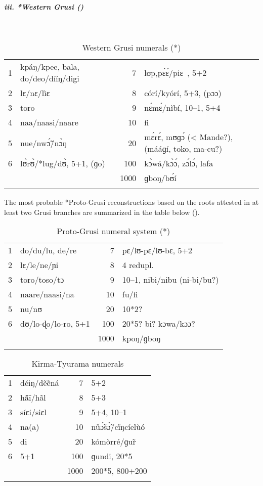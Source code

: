 \subparagraph{iii. *Western Grusi ()}
~
\begin{table}[h]
\caption{\label{tab:3:176}Western Grusi numerals (*)}
\begin{tabularx}{\textwidth}{llrQ}
\lsptoprule
{1} & kpáŋ/kpee, bala, do/deo/dííŋ/digi & {7} & lʊp,p{\'{ɛ}}{\'{ɛ}}/piɛ~, 5+2\\
{2} & lɛ/nɛ/lìɛ & {8} & córí/kyórí, 5+3, (pɔɔ)\\
{3} & toro & {9} & n{\'{ɛ}}m{\'{ɛ}}/nìbí, 10--1, 5+4\\
{4} & naa/naasi/naare & {10} & fi\\
{5} & nue/nw{\'{\~ɔ}}/n{\`{ɔ}}ŋ & {20} & m{\'{ɛ}}r{\'{ɛ}}, mʊɡ{\'{ɔ}} (< Mande?), (mááɡí, toko, ma-cu?)\\
{6} & l{\`{ʊ}}r{\`{ʊ}}/*lug/d{\`{ʊ}}, 5+1, (ɡo) & {100} & k{\`{ɔ}}wá/k{\`{ɔ}}{\'{ɔ}}, z{\'{ɔ}}l{\'{ɔ}}, lafa\\
&  & {1000} & ɡboŋ/b{\'{ʊ}}í\\
\lspbottomrule
\end{tabularx}
\end{table}

  
The most probable *Proto-Grusi reconstructions based on the roots attested in at least two Grusi branches are summarized in the table below ().

\begin{table}
\caption{\label{tab:3:177}Proto-Grusi numeral system (*)}
\begin{tabularx}{\textwidth}{lXrl}
\lsptoprule
{1} & do/du/lu, de/re & {7} & pɛ/lʊ-pɛ/lʊ-bɛ, 5+2\\
{2} & lɛ/le/ne/ɲi & {8} & 4 redupl.\\
{3} & toro/toso/tɔ & {9} & 10--1, nibi/nibu (ni-bi/bu?)\\
{4} & naare/naasi/na & {10} & fu/fi\\
{5} & nu/nʊ & {20} & 10*2?\\
{6} & dʊ/lo-ɖo/lo-ro, 5+1 & {100} & 20*5? bi? kɔwa/kɔɔ?\\
&  & {1000} & kpoŋ/ɡboŋ\\
\lspbottomrule
\end{tabularx}
\end{table}

  
\begin{table}
\caption{\label{tab:3:178}Kirma-Tyurama numerals}
\begin{tabularx}{\textwidth}{lXrl}
\lsptoprule
{1} & déiŋ/d{\~{e}}{\~{e}}ná & {7} & 5+2\\
{2} & h{\'ã}{\~{i}}/h{\~{a}}l & {8} & 5+3\\
{3} & síɛi/siɛl & {9} & 5+4, 10--1\\
{4} & na(a) & {10} & n{\'ũ}{\'{\~ɔ}}s{\`{\~ɔ}}/c{\'ĩ}ŋcíelùó\\
{5} & di & {20} & kómòrré/ɡu{\~{r}}\\
{6} & 5+1 & {100} & ɡundi, 20*5\\
&  & {1000} & 200*5, 800+200\\
\lspbottomrule
\end{tabularx}
\end{table}

